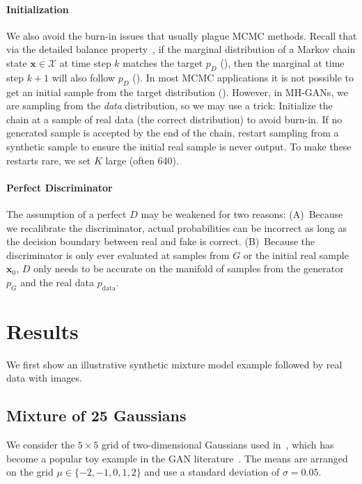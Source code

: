 \documentclass{article}
\renewcommand{\vec}[1]{{\boldsymbol{\mathbf{#1}}}} %
\newcommand{\set}[1]{\mathcal{#1}}
\newcommand{\sample}{\sim}
\newcommand{\PG}{{p_G}}
\newcommand{\PD}{{p_D}}
\newcommand{\PR}{{p_{\textrm{data}}}}
\newcommand{\setx}{\set{X}}
\begin{document}
\paragraph{Initialization}
We also avoid the burn-in issues that usually plague MCMC methods.
Recall that via the detailed balance property~\citep[Ch.~1]{Gilks1996}, if the marginal distribution of a Markov chain state $\vec x \in \setx$ at time step $k$ matches the target $\PD$ (\smash{$\vec x_k \sample \PD$}), then the marginal at time step $k+1$ will also follow $\PD$ (\smash{$\vec x_{k+1} \sample \PD$})\@.
In most MCMC applications it is not possible to get an initial sample from the target distribution (\smash{$\vec x_0 \sample \PD$})\@.
However, in MH-GANs, we are sampling from the \emph{data} distribution, so we may use a trick:
Initialize the chain at a sample of real data (the correct distribution) to avoid burn-in.
If no generated sample is accepted by the end of the chain, restart sampling from a synthetic sample to ensure the initial real sample is never output.
To make these restarts rare, we set $K$ large (often 640)\@.

\paragraph{Perfect Discriminator}
The assumption of a perfect $D$ may be weakened for two reasons:
(A)~Because we recalibrate the discriminator, actual probabilities can be incorrect as long as the decision boundary between real and fake is correct.
(B)~Because the discriminator is only ever evaluated at samples from $G$ or the initial real sample $\vec x_0$, $D$ only needs to be accurate on the manifold of samples from the generator $\PG$ and the real data $\PR$.



\section{Results}
\label{sec:Results}

We first show an illustrative synthetic mixture model example followed by real data with images.

\subsection{Mixture of 25 Gaussians}

We consider the $5 \times 5$ grid of two-dimensional Gaussians used in~\citet{Azadi2018}, which has become a popular toy example in the GAN literature~\citep{Dumoulin2016}.
The means are arranged on the grid $\mu \in \{{-2},{-1},0,1,2\}$ and use a standard deviation of $\sigma = 0.05$.
\end{document}
